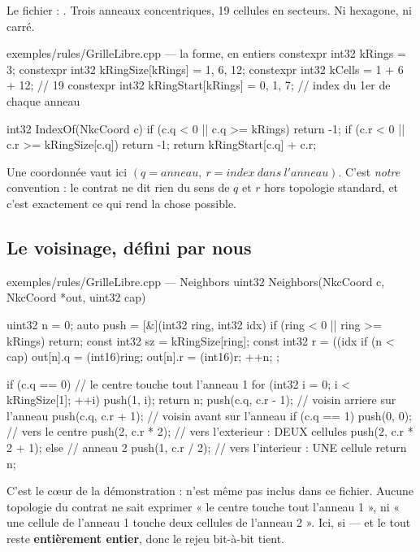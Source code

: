 Le fichier : .
Trois anneaux concentriques, 19 cellules en secteurs. Ni hexagone, ni carré.

\begin{nkcode}{exemples/rules/GrilleLibre.cpp — la forme, en entiers}
constexpr int32 kRings            = 3;
constexpr int32 kRingSize[kRings] = {1, 6, 12};
constexpr int32 kCells            = 1 + 6 + 12;   // 19
constexpr int32 kRingStart[kRings] = {0, 1, 7};   // index du 1er de chaque anneau

int32 IndexOf(NkcCoord c) {
    if (c.q < 0 || c.q >= kRings) return -1;
    if (c.r < 0 || c.r >= kRingSize[c.q]) return -1;
    return kRingStart[c.q] + c.r;
}
\end{nkcode}

Une coordonnée vaut ici $(q = anneau,\ r = index\ dans\ l'anneau)$. C'est
\emph{notre} convention : le contrat ne dit rien du sens de $q$ et $r$ hors
topologie standard, et c'est exactement ce qui rend la chose possible.

\subsection{Le voisinage, défini par nous}

\begin{nkcode}{exemples/rules/GrilleLibre.cpp — Neighbors}
uint32 Neighbors(NkcCoord c, NkcCoord *out, uint32 cap) {
    uint32 n = 0;
    auto   push = [&](int32 ring, int32 idx) {
          if (ring < 0 || ring >= kRings) return;
          const int32 sz = kRingSize[ring];
          const int32 r  = ((idx %
          if (n < cap) { out[n].q = (int16)ring; out[n].r = (int16)r; }
          ++n;
    };

    if (c.q == 0) {                     // le centre touche tout l'anneau 1
        for (int32 i = 0; i < kRingSize[1]; ++i) push(1, i);
        return n;
    }
    push(c.q, c.r - 1);                 // voisin arriere sur l'anneau
    push(c.q, c.r + 1);                 // voisin avant  sur l'anneau
    if (c.q == 1) {
        push(0, 0);                     // vers le centre
        push(2, c.r * 2);               // vers l'exterieur : DEUX cellules
        push(2, c.r * 2 + 1);
    } else {                            // anneau 2
        push(1, c.r / 2);               // vers l'interieur : UNE cellule
    }
    return n;
}
\end{nkcode}

C'est le cœur de la démonstration :  n'est même pas
inclus dans ce fichier. Aucune topologie du contrat ne sait exprimer « le centre
touche tout l'anneau 1 », ni « une cellule de l'anneau 1 touche deux cellules de
l'anneau 2 ». Ici, si — et le tout reste \textbf{entièrement entier}, donc le
rejeu bit-à-bit tient.

